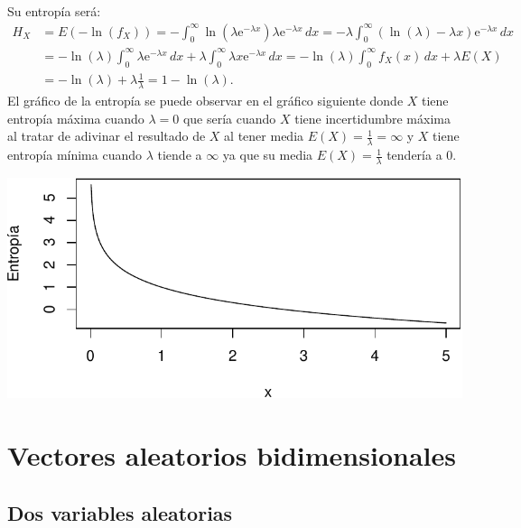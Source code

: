 \documentclass[
  letterpaper,
  DIV=11,
  numbers=noendperiod]{scrreprt}
\begin{document}
Su entropía será: \[
\begin{array}{rl}
H_X & = \displaystyle E\left(-\ln(f_X)\right)=-\int_0^\infty \ln\left(\lambda\mathrm{e}^{-\lambda x}\right)\lambda\mathrm{e}^{-\lambda x}\, dx = -\lambda \int_0^\infty (\ln(\lambda) -\lambda x)\mathrm{e}^{-\lambda x}\, dx \\[1ex] & =\displaystyle -\ln (\lambda)\int_0^\infty \lambda\mathrm{e}^{-\lambda x}\, dx+\lambda \int_0^\infty \lambda x \mathrm{e}^{-\lambda x}\, dx =-\ln(\lambda)\int_0^\infty f_X(x)\, dx +\lambda E(X)\\[1ex] & =\displaystyle -\ln(\lambda)+\lambda \frac{1}{\lambda} =1-\ln(\lambda).
\end{array}
\] El gráfico de la entropía se puede observar en el gráfico siguiente
donde \(X\) tiene entropía máxima cuando \(\lambda=0\) que sería cuando
\(X\) tiene incertidumbre máxima al tratar de adivinar el resultado de
\(X\) al tener media \(E(X)=\frac{1}{\lambda}=\infty\) y \(X\) tiene
entropía mínima cuando \(\lambda\) tiende a \(\infty\) ya que su media
\(E(X)=\frac{1}{\lambda}\) tendería a 0.

\includegraphics{4_files/figure-pdf/unnamed-chunk-14-1.pdf}


\hypertarget{vectores-aleatorios-bidimensionales}{%
\chapter{Vectores aleatorios
bidimensionales}\label{vectores-aleatorios-bidimensionales}}

\hypertarget{dos-variables-aleatorias}{%
\section{Dos variables aleatorias}\label{dos-variables-aleatorias}}
\end{document}
